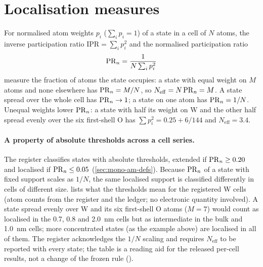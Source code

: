 \section{Localisation measures}
\label{sec:mono-defect-pr}

For normalised atom weights $p_i$ ($\sum_i p_i = 1$) of a state in a cell of $N$ atoms, the inverse participation ratio
$\mathrm{IPR} = \sum_ip_i^2$ and the normalised participation ratio
\begin{equation}
\mathrm{PR}_{n} = \frac{1}{N\sum_i p_i^2}
\label{eq:mono-defect-pr}
\end{equation}
\citep{BellDean1970,Thouless1974} measure the fraction of atoms the state occupies: a state with equal weight on $M$
atoms and none elsewhere has $\mathrm{PR}_{n} = M/N$, so $N_{\mathrm{eff}} = N\,\mathrm{PR}_{n} = M$. A state spread over the whole cell has
$\mathrm{PR}_{n} \to 1$; a state on one atom has $\mathrm{PR}_{n} = 1/N$. Unequal weights lower $\PRn$: a state with half its weight on W and
the other half spread evenly over the six first-shell O has $\sum p_i^2 = 0.25 + 6/144$ and $N_{\mathrm{eff}} = 3.4$.

\paragraph{A property of absolute thresholds across a cell series.} The register classifies states with absolute
thresholds, extended if $\mathrm{PR}_{n} \ge 0.20$ and localised if $\mathrm{PR}_{n} \le 0.05$ (\cref{sec:mono-am-defs}). Because $\PRn$ of a
state with fixed support scales as $1/N$, the same localised support is classified differently in cells of different
size.  lists what the thresholds mean for the registered W cells (atom counts from the
register and the ledger; no electronic quantity involved). A state spread evenly over W and its six first-shell O atoms
($M = 7$) would count as localised in the 0.7, 0.8 and 2.0~nm cells but as intermediate in the bulk and 1.0~nm cells;
more concentrated states (as the example above) are localised in all of them. The register acknowledges the $1/N$
scaling and requires $N_{\mathrm{eff}}$ to be reported with every state; the table is a reading aid for the released
per-cell results, not a change of the frozen rule ().

\begin{table}[htbp]\centering\small
\caption{Support sizes implied by the frozen $\PRn$ thresholds for the registered W-doped amorphous cells.}
\label{tab:mono-defect-pr}
\end{table}

